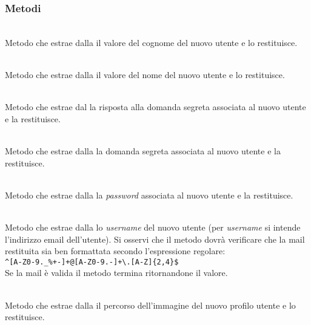 \subsubsection*{Metodi}
\begin{description}

	\item{}\\
	Metodo che estrae dalla  il valore del cognome del nuovo utente e lo restituisce.
	
	\item{}\\
	Metodo che estrae dalla  il valore del nome del nuovo utente e lo restituisce.
	
	\item{}\\
	Metodo che estrae dal  la risposta alla domanda segreta associata al nuovo utente e la restituisce.	
		
	\item{}\\
	Metodo che estrae dalla  la domanda segreta associata al nuovo utente e la restituisce.
	
	\item{}\\
	Metodo che estrae dalla  la \textit{password} associata al nuovo utente e la restituisce.
	
	\item{}\\
	Metodo che estrae dalla  lo \textit{username} del nuovo utente (per \textit{username} si intende l'indirizzo email dell'utente). Si osservi che il metodo dovrà verificare che la mail restituita sia ben formattata secondo l'espressione regolare:\\
	
	\verb|^[A-Z0-9._%+-]+@[A-Z0-9.-]+\.[A-Z]{2,4}$|
	\\
	
	Se la mail è valida il metodo termina ritornandone il valore.
	
	\item{}\\
	Metodo che estrae dalla  il percorso dell'immagine del nuovo profilo utente e lo restituisce.
	

\end{description}
